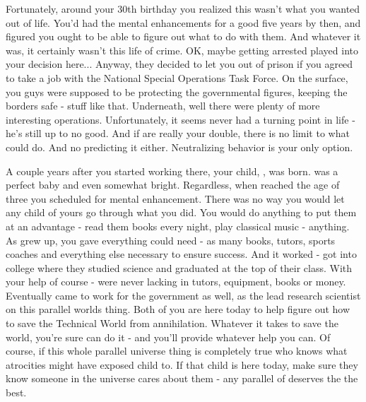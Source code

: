 \documentclass[char]{guildcamp3}
\begin{document}
Fortunately, around your 30th birthday you realized this wasn't what you wanted out of life. You'd had the mental enhancements for a good five years by then, and figured you ought to be able to figure out what to do with them. And whatever it was, it certainly wasn't this life of crime. OK, maybe getting arrested played into your decision here... Anyway, they decided to let you out of prison if you agreed to take a job with the National Special Operations Task Force. On the surface, you guys were supposed to be protecting the governmental figures, keeping the borders safe - stuff like that. Underneath, well there were plenty of more interesting operations. Unfortunately, it seems \cRogueTwo{\formal} never had a turning point in \cRogueTwo{\their} life - he's still up to no good. And if  are really your double, there is no limit to what \cRogueTwo{\they} could do. And no predicting it either. Neutralizing \cRogueTwo{\their} behavior is your only option. 

A couple years after you started working there, your child, \cSciOne{\intro}, was born. \cSciOne{\they} was a perfect baby and even somewhat bright. Regardless, when \cSciOne{\they} reached the age of three you scheduled \cSciOne{\them} for mental enhancement. There was no way you would let any child of yours go through what you did. You would do anything to put them at an advantage - read them books every night, play classical music - anything. As \cSciOne{\informal} grew up, you gave \cSciOne{\them} everything \cSciOne{\they} could need - as many books, tutors, sports coaches and everything else necessary to ensure success. And it worked - \cSciOne{\informal} got into college where they studied science and graduated at the top of their class. With your help of course - \cSciOne{\they} were never lacking in tutors, equipment, books or money. Eventually \cSciOne{} came to work for the government as well, as the lead research scientist on this parallel worlds thing. Both of you are here today to help figure out how to save the Technical World from annihilation. Whatever it takes to save the world, you're sure \cSciOne{\informal} can do it - and you'll provide whatever help you can. Of course, if this whole parallel universe thing is completely true who knows what atrocities \cRogueTwo{} might have exposed  child to. If that child is here today, make sure they know someone in the universe cares about them - any parallel of \cSciOne{\informal} deserves the the best. 
\end{document}
